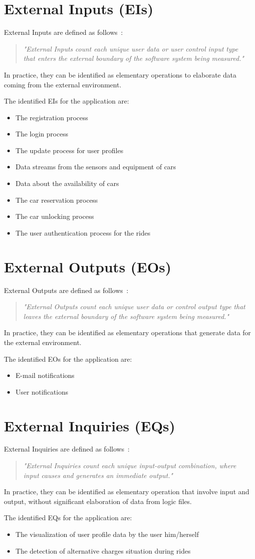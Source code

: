 \section{External Inputs (EIs)}
External Inputs are defined as follows~\cite{cocomo-manual}:
\begin{quotation}
\textit{"External Inputs count each unique user data or user control input type that enters the external boundary of the software system being measured."}
\end{quotation}
In practice, they can be identified as elementary operations to elaborate data coming from the external environment.

The identified EIs for the application are:
\begin{itemize}
\item The registration process
\item The login process
\item The update process for user profiles
\item Data streams from the sensors and equipment of cars
\item Data about the availability of cars
\item The car reservation process
\item The car unlocking process
\item The user authentication process for the rides
\end{itemize}

\section{External Outputs (EOs)}
External Outputs are defined as follows~\cite{cocomo-manual}:
\begin{quotation}
\textit{"External Outputs count each unique user data or control output type that leaves the external boundary of the software system being measured."}
\end{quotation}
In practice, they can be identified as elementary operations that generate data for the external environment.

The identified EOs for the application are:
\begin{itemize}
\item E-mail notifications
\item User notifications
\end{itemize}

\section{External Inquiries (EQs)}
External Inquiries are defined as follows~\cite{cocomo-manual}:
\begin{quotation}
\textit{"External Inquiries count each unique input-output combination, where input causes and generates an immediate output."}
\end{quotation}
In practice, they can be identified as elementary operation that involve input and output, without significant elaboration of data from logic files.

The identified EQs for the application are:
\begin{itemize}
\item The visualization of user profile data by the user him/herself
\item The detection of alternative charges situation during rides
\end{itemize}